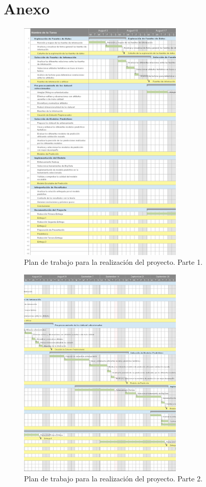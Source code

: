 \chapter{Anexo}

\begin{figure}[H]
  \centering
    \includegraphics[width=0.7\textwidth]{Figuras/Gantt1}
      \caption{Plan de trabajo para la realización del proyecto. Parte 1.}
    \label{fig:cgantt}
\end{figure}
\begin{figure}[H]
  \centering
    \includegraphics[width=0.7\textwidth]{Figuras/Gantt2}
      \caption{Plan de trabajo para la realización del proyecto. Parte 2.}
    \label{fig:cgantt2}
\end{figure}
